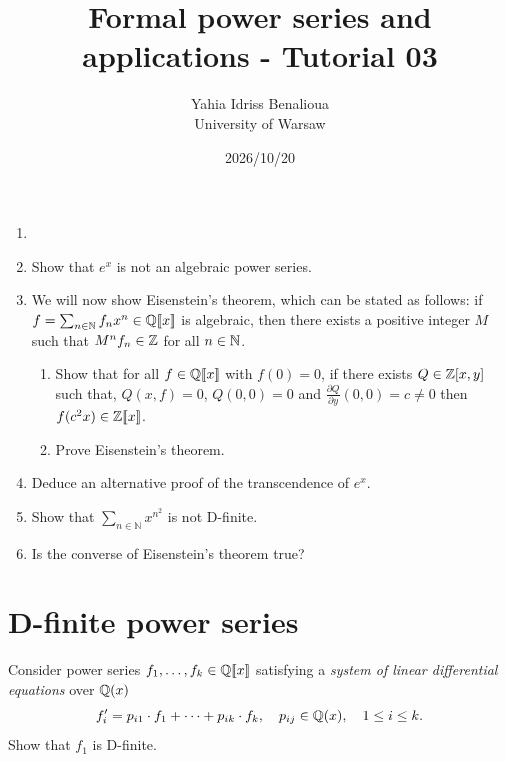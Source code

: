 

\title{Formal power series and applications - Tutorial 03}
\date{2026/10/20}
\author{Yahia Idriss Benalioua \\ \small University of Warsaw}



\maketitle

\begin{exercise}
    \begin{enumerate}
        \item[]
        \item Show that $e^x$ is not an algebraic power series.
        \item We will now show Eisenstein's theorem, which can be
            stated as follows: if $f = \sum_{n \in \mathbb N} f_n x^n \in
            \mathbb Q[\![x]\!]$ is algebraic, then there exists a
            positive integer $M$ such that $M^n f_n \in \mathbb Z$ for
            all $n \in \mathbb N$.
            \begin{enumerate}
                \item Show that for all $f \in \mathbb Q[\![x]\!]$
                    with $f(0) = 0$, if there exists $Q \in
                    \mathbb Z[x,y]$ such that, $Q(x,f)=0$, $Q(0,0)=0$
                    and $\frac{\partial Q}{\partial y}(0,0) = c \neq
                    0$ then $f(c^2x) \in \mathbb Z[\![x]\!]$.
                \item Prove Eisenstein's theorem.
            \end{enumerate}
        \item Deduce an alternative proof of the transcendence of $e^x$.
        \item Show that $\sum_{n \in \mathbb{N}} x^{n^2}$ is not D-finite.
        \item  Is the converse of Eisenstein's theorem true?
    \end{enumerate}
\end{exercise}

\section*{D-finite power series}

\begin{exercise}
    Consider power series $f_1, \dots, f_k \in \mathbb Q[\![x]\!]$
    satisfying a \emph{system of linear differential equations} over $\mathbb Q(x)$
    \[
        f_i' = p_{i1} \cdot f_1 + \dots + p_{ik} \cdot f_k,
        \quad p_{ij} \in \mathbb Q(x),
        \quad 1 \leq i \leq k.
    \]
    Show that $f_1$ is D-finite.
\end{exercise}

